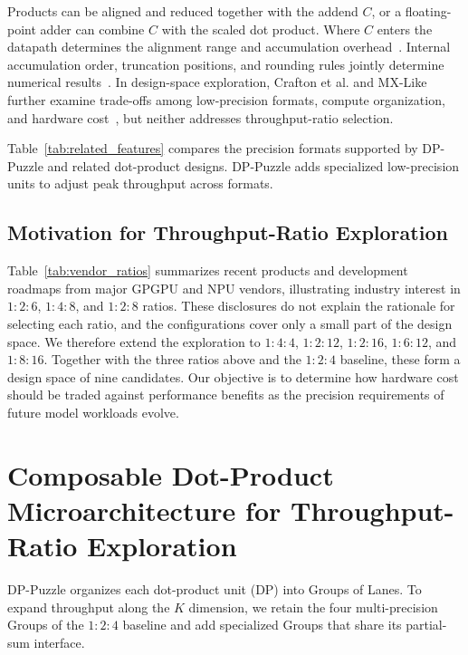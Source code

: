 \documentclass[conference,10pt,letterpaper]{IEEEtran}
\begin{document}
Products can be aligned and reduced together with the addend $C$, or a floating-point adder can combine $C$ with the scaled dot product. Where $C$ enters the datapath determines the alignment range and accumulation overhead~\cite{bertaccini2022minifloat,lutzFusedFP84Way2024}. Internal accumulation order, truncation positions, and rounding rules jointly determine numerical results~\cite{sun2023tensorcores,xie2025mmasim}. In design-space exploration, Crafton et al. and MX-Like further examine trade-offs among low-precision formats, compute organization, and hardware cost~\cite{paretomac2025,zhao2026mxlike}, but neither addresses throughput-ratio selection.

Table~\ref{tab:related_features} compares the precision formats supported by DP-Puzzle and related dot-product designs. DP-Puzzle adds specialized low-precision units to adjust peak throughput across formats.

\subsection{Motivation for Throughput-Ratio Exploration}
\label{sec:commercial_ratios}
\label{sec:ratio_motivation}

Table~\ref{tab:vendor_ratios} summarizes recent products and development roadmaps from major GPGPU and NPU vendors, illustrating industry interest in $1:2:6$, $1:4:8$, and $1:2:8$ ratios. These disclosures do not explain the rationale for selecting each ratio, and the configurations cover only a small part of the design space. We therefore extend the exploration to $1:4:4$, $1:2:12$, $1:2:16$, $1:6:12$, and $1:8:16$. Together with the three ratios above and the $1:2:4$ baseline, these form a design space of nine candidates. Our objective is to determine how hardware cost should be traded against performance benefits as the precision requirements of future model workloads evolve.

\section{Composable Dot-Product Microarchitecture for Throughput-Ratio Exploration}
\label{sec:architecture}
\label{sec:brick_definition}

DP-Puzzle organizes each dot-product unit (DP) into Groups of Lanes. To expand throughput along the $K$ dimension, we retain the four multi-precision Groups of the $1:2:4$ baseline and add specialized Groups that share its partial-sum interface.
\end{document}
